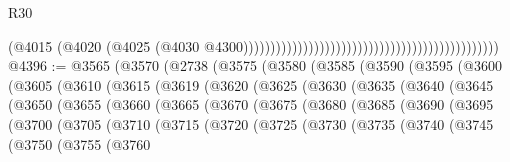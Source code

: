 \begin{lexlean}{R30}
\begin{coremodule}
                                                                                          (@4015
                                                                                            (@4020
                                                                                              (@4025
                                                                                                (@4030
                                                                                                  @4300)))))))))))))))))))))))))))))))))))))))))))))))
@4396 := @3565
    (@3570
      (@2738
        (@3575
          (@3580
            (@3585
              (@3590
                (@3595
                  (@3600
                    (@3605
                      (@3610
                        (@3615
                          (@3619
                            (@3620
                              (@3625
                                (@3630
                                  (@3635
                                    (@3640
                                      (@3645
                                        (@3650
                                          (@3655
                                            (@3660
                                              (@3665
                                                (@3670
                                                  (@3675
                                                    (@3680
                                                      (@3685
                                                        (@3690
                                                          (@3695
                                                            (@3700
                                                              (@3705
                                                                (@3710
                                                                  (@3715
                                                                    (@3720
                                                                      (@3725
                                                                        (@3730
                                                                          (@3735
                                                                            (@3740
                                                                              (@3745
                                                                                (@3750
                                                                                  (@3755
                                                                                    (@3760

\end{coremodule}
\end{lexlean}
